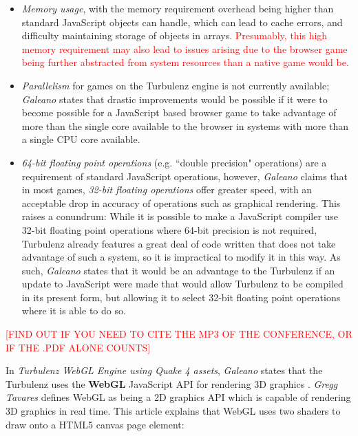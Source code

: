 \begin{itemize}
	\item \emph{Memory usage}, with the memory requirement overhead being higher than standard JavaScript objects can handle, which can lead to cache errors, and difficulty maintaining storage of objects in arrays. \textcolor{red}{Presumably, this high memory requirement may also lead to issues arising due to the browser game being further abstracted from system resources than a native game would be.}
	
	\item \emph{Parallelism} for games on the Turbulenz engine is not currently available; \emph{Galeano} states that drastic improvements would be possible if it were to become possible for a JavaScript based browser game to take advantage of more than the single core available to the browser in systems with more than a single CPU core available.
	
	\item \emph{64-bit floating point operations} (e.g. ``double precision" operations) are a requirement of standard JavaScript operations, however, \emph{Galeano} claims that in most games, \emph{32-bit floating operations} offer greater speed, with an acceptable drop in accuracy of operations such as graphical rendering. This raises a conundrum: While it is possible to make a JavaScript compiler use 32-bit floating point operations where 64-bit precision is not required, Turbulenz already features a great deal of code written that does not take advantage of such a system, so it is impractical to modify it in this way. As such, \emph{Galeano} states that it would be an advantage to the Turbulenz if an update to JavaScript were made that would allow Turbulenz to be compiled in its present form, but allowing it to select 32-bit floating point operations where it is able to do so.
\end{itemize} 

\textcolor{red}{[FIND OUT IF YOU NEED TO CITE THE MP3 OF THE CONFERENCE, OR IF THE .PDF ALONE COUNTS]}

In \emph{Turbulenz WebGL Engine using Quake 4 assets}, \emph{Galeano} states that the Turbulenz uses the \textbf{WebGL} JavaScript API for rendering 3D graphics \cite{TurbulenzWebGLQuake4AssetsVideo}. \emph{Gregg Tavares} defines WebGL as being a 2D graphics API which is capable of rendering 3D graphics in real time\cite{WebGLFundamentals}. This article explains that WebGL uses two shaders to draw onto a HTML5 canvas page element:

